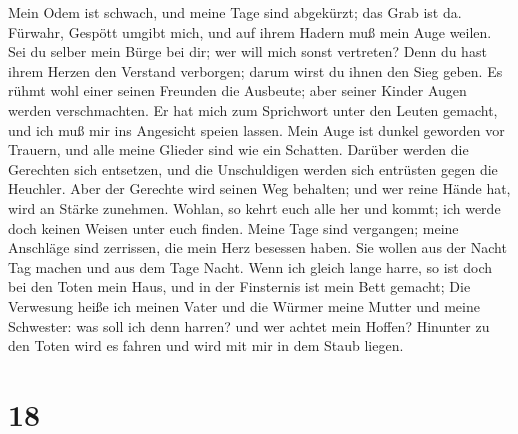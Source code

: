  Mein Odem ist schwach, und meine Tage sind abgekürzt; das
Grab ist da.  Fürwahr, Gespött umgibt mich, und auf ihrem
Hadern muß mein Auge weilen.  Sei du selber mein Bürge bei
dir; wer will mich sonst vertreten?  Denn du hast ihrem
Herzen den Verstand verborgen; darum wirst du ihnen den Sieg geben.
 Es rühmt wohl einer seinen Freunden die Ausbeute; aber
seiner Kinder Augen werden verschmachten.  Er hat mich zum
Sprichwort unter den Leuten gemacht, und ich muß mir ins Angesicht
speien lassen.  Mein Auge ist dunkel geworden vor Trauern,
und alle meine Glieder sind wie ein Schatten.  Darüber
werden die Gerechten sich entsetzen, und die Unschuldigen werden sich
entrüsten gegen die Heuchler.  Aber der Gerechte wird seinen
Weg behalten; und wer reine Hände hat, wird an Stärke zunehmen.
 Wohlan, so kehrt euch alle her und kommt; ich werde doch
keinen Weisen unter euch finden.  Meine Tage sind
vergangen; meine Anschläge sind zerrissen, die mein Herz besessen haben.
 Sie wollen aus der Nacht Tag machen und aus dem Tage
Nacht.  Wenn ich gleich lange harre, so ist doch bei den
Toten mein Haus, und in der Finsternis ist mein Bett gemacht;
 Die Verwesung heiße ich meinen Vater und die Würmer meine
Mutter und meine Schwester:  was soll ich denn harren? und
wer achtet mein Hoffen?  Hinunter zu den Toten wird es
fahren und wird mit mir in dem Staub liegen.

\hypertarget{section-17}{%
\section{18}\label{section-17}}

